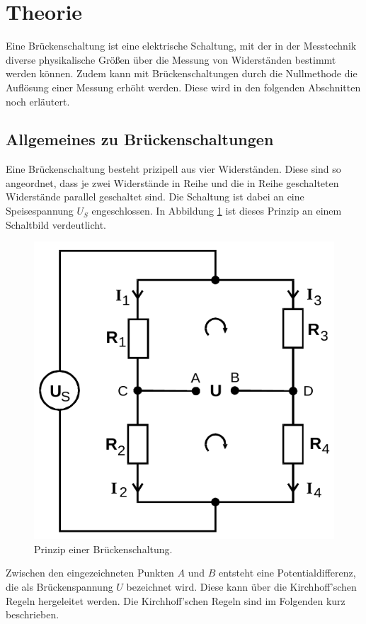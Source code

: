 \section{Theorie}
\label{sec:Theorie}
Eine Brückenschaltung ist eine elektrische Schaltung, mit der in der Messtechnik diverse physikalische Größen über die Messung von 
Widerständen bestimmt werden können. Zudem kann mit Brückenschaltungen durch die Nullmethode die Auflösung einer Messung erhöht werden.
Diese wird in den folgenden Abschnitten noch erläutert.

\subsection{Allgemeines zu Brückenschaltungen}                      
\label{sec:allg}
Eine Brückenschaltung besteht prizipell aus vier Widerständen. Diese sind so angeordnet, dass je zwei Widerstände in Reihe und 
die in Reihe geschalteten Widerstände parallel geschaltet sind. Die Schaltung ist dabei an eine Speisespannung $U_S$ engeschlossen. 
In Abbildung \ref{fig:allg} ist dieses Prinzip an einem Schaltbild verdeutlicht. 

\begin{figure}[H]
    \centering
    \includegraphics[scale=0.4]{pictures/1-allg.png}
    \caption{Prinzip einer Brückenschaltung. \cite{AP01}}
    \label{fig:allg}
\end{figure}
\noindent
Zwischen den eingezeichneten Punkten $A$ und $B$ entsteht eine Potentialdifferenz, die als Brückenspannung $U$ bezeichnet wird. Diese 
kann über die Kirchhoff'schen Regeln hergeleitet werden. Die Kirchhoff'schen Regeln sind im Folgenden kurz beschrieben. 

